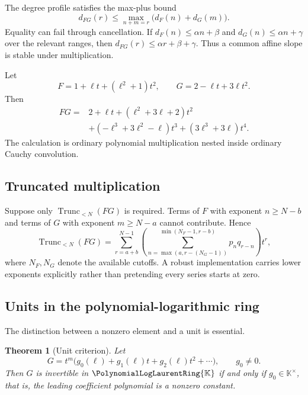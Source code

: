 \documentclass[11pt,oneside]{article}
\numberwithin{equation}{section}
\newtheorem{theorem}{Theorem}[section]
\theoremstyle{definition}
\newcommand{\K}{\mathbb{K}}
\newcommand{\PL}{\PolynomialLogLaurentRing{\K}}
\newcommand{\TransseriesTruncateBelow}[2]{%
  \operatorname{Trunc}_{<#2}\!\left(#1\right)%
}
\begin{document}
The degree profile satisfies the max-plus bound
\begin{equation}\label{eq:degree-convolution}
  d_{FG}(r)\le
  \max_{n+m=r}\bigl(d_F(n)+d_G(m)\bigr).
\end{equation}
Equality can fail through cancellation.  If
\(d_F(n)\le\alpha n+\beta\) and
\(d_G(n)\le\alpha n+\gamma\) over the relevant ranges, then
\(d_{FG}(r)\le\alpha r+\beta+\gamma\).  Thus a common affine slope is stable
under multiplication.

\begin{examplebox}
Let
\[
 F=1+\ell t+(\ell^2+1)t^2,
 \qquad
 G=2-\ell t+3\ell t^2.
\]
Then
\begin{align*}
 FG={}&2+\ell t+(\ell^2+3\ell+2)t^2\\
 &+(-\ell^3+3\ell^2-\ell)t^3
 +(3\ell^3+3\ell)t^4.
\end{align*}
The calculation is ordinary polynomial multiplication nested inside ordinary
Cauchy convolution.
\end{examplebox}

\subsection{Truncated multiplication}

Suppose only \(\TransseriesTruncateBelow{FG}{N}\) is required.  Terms of \(F\) with exponent
\(n\ge N-b\) and terms of \(G\) with exponent \(m\ge N-a\) cannot contribute.
Hence
\begin{equation}\label{eq:truncated-product}
  \TransseriesTruncateBelow{FG}{N}
  =\sum_{r=a+b}^{N-1}
    \left(\sum_{n=\max(a,r-(N_G-1))}^{\min(N_F-1,r-b)}p_nq_{r-n}\right)t^r,
\end{equation}
where \(N_F,N_G\) denote the available cutoffs.  A robust implementation carries
lower exponents explicitly rather than pretending every series starts at zero.

\subsection{Units in the polynomial-logarithmic ring}

The distinction between a nonzero element and a unit is essential.

\begin{theorem}[Unit criterion]\label{thm:unit-criterion}
Let
\[
  G=t^m\bigl(g_0(\ell)+g_1(\ell)t+g_2(\ell)t^2+\cdots\bigr),
  \qquad g_0\ne0.
\]
Then \(G\) is invertible in \(\PL\) if and only if
\(g_0\in\K^\times\), that is, the leading coefficient polynomial is a nonzero
constant.
\end{theorem}
\end{document}
